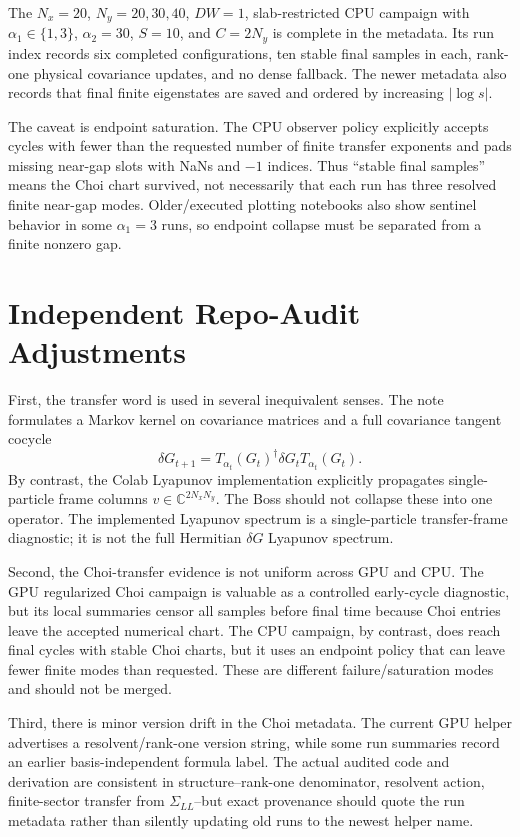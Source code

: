 \documentclass[aps,prb,onecolumn,nofootinbib,superscriptaddress]{revtex4-2}
\newcommand{\SigmaLL}{\Sigma_{LL}}
\begin{document}
The \(N_x=20\), \(N_y=20,30,40\), \(DW=1\), slab-restricted CPU campaign with
\(\alpha_1\in\{1,3\}\), \(\alpha_2=30\), \(S=10\), and \(C=2N_y\) is complete
in the metadata.  Its run index records six completed configurations, ten
stable final samples in each, rank-one physical covariance updates, and no
dense fallback.  The newer metadata also records that final finite eigenstates
are saved and ordered by increasing \(|\log s|\).

The caveat is endpoint saturation.  The CPU observer policy explicitly accepts
cycles with fewer than the requested number of finite transfer exponents and
pads missing near-gap slots with NaNs and \(-1\) indices.  Thus
``stable final samples'' means the Choi chart survived, not necessarily that
each run has three resolved finite near-gap modes.  Older/executed plotting
notebooks also show sentinel behavior in some \(\alpha_1=3\) runs, so endpoint
collapse must be separated from a finite nonzero gap.

\section{Independent Repo-Audit Adjustments}

First, the transfer word is used in several inequivalent senses.  The
 note formulates a Markov kernel on covariance
matrices and a full covariance tangent cocycle
\[
  \delta G_{t+1}=T_{\alpha_t}(G_t)^\dagger\delta G_t T_{\alpha_t}(G_t).
\]
By contrast, the Colab Lyapunov implementation explicitly propagates
single-particle frame columns \(v\in\mathbb{C}^{2N_xN_y}\).  The Boss should
not collapse these into one operator.  The implemented Lyapunov spectrum is a
single-particle transfer-frame diagnostic; it is not the full Hermitian
\(\delta G\) Lyapunov spectrum.

Second, the Choi-transfer evidence is not uniform across GPU and CPU.  The GPU
regularized Choi campaign is valuable as a controlled early-cycle diagnostic,
but its local summaries censor all samples before final time because Choi
entries leave the accepted numerical chart.  The CPU campaign, by contrast,
does reach final cycles with stable Choi charts, but it uses an endpoint policy
that can leave fewer finite modes than requested.  These are different
failure/saturation modes and should not be merged.

Third, there is minor version drift in the Choi metadata.  The current GPU
helper advertises a resolvent/rank-one version string, while some run summaries
record an earlier basis-independent formula label.  The actual audited code and
derivation are consistent in structure--rank-one denominator, resolvent action,
finite-sector transfer from \(\SigmaLL\)--but exact provenance should quote the
run metadata rather than silently updating old runs to the newest helper name.
\end{document}
